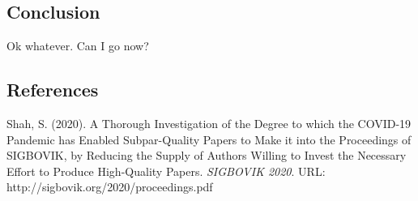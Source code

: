 \documentclass[12pt]{sigbovik-review}
\begin{document}
\subsection{Conclusion}
Ok whatever. Can I go now?

\subsection{References}

Shah, S. (2020). A Thorough Investigation of the Degree to which the COVID-19 Pandemic has Enabled Subpar-Quality Papers to Make it into the Proceedings of SIGBOVIK, by Reducing the Supply of Authors Willing to Invest the Necessary Effort to Produce High-Quality Papers. \textit{SIGBOVIK 2020}. URL: http://sigbovik.org/2020/proceedings.pdf
\end{document}
